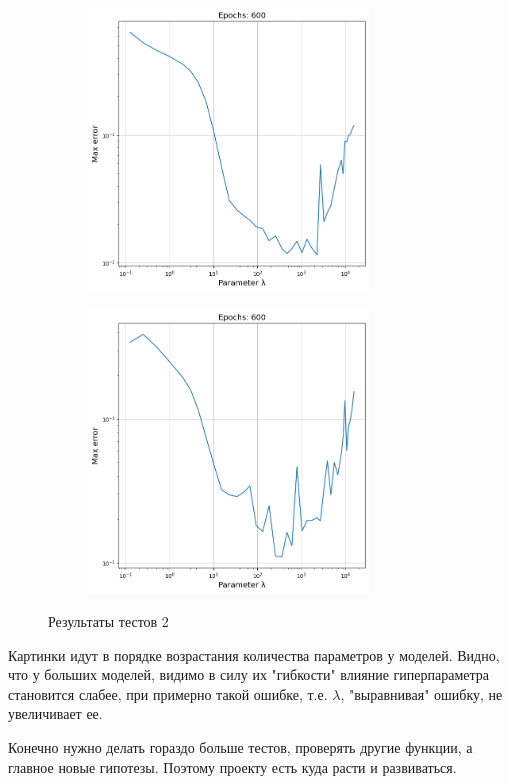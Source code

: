 \begin{figure}[ht!]
    \centering
    \begin{subfigure}{0.45\textwidth}{
        \includegraphics[height=7.5cm, keepaspectratio]{images/14.png}
    }
    \end{subfigure}
    \hfill
    \begin{subfigure}{0.45\textwidth}{
        \includegraphics[height=7.5cm, keepaspectratio]{images/15.png}
    }
    \end{subfigure}
    \caption{Результаты тестов 2}
\end{figure}

Картинки идут в порядке возрастания количества параметров у моделей. Видно, что у больших моделей, видимо в силу их "гибкости" 
влияние гиперпараметра становится слабее, при примерно такой ошибке, т.е. $\lambda$, "выравнивая" ошибку, не увеличивает ее.

Конечно нужно делать гораздо больше тестов, проверять другие функции, а главное новые гипотезы. Поэтому проекту есть куда расти и развиваться.

\newpage
